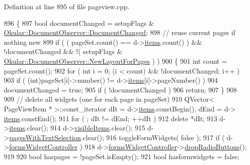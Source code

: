 Definition at line 895 of file pageview.\+cpp.


\begin{DoxyCode}
896 \{
897     \textcolor{keywordtype}{bool} documentChanged = setupFlags & 
      \hyperlink{classOkular_1_1DocumentObserver_aba00584af99894f95a9650e91f109d40ae599564392c01b22e96eff7602c4dd03}{Okular::DocumentObserver::DocumentChanged};
898     \textcolor{comment}{// reuse current pages if nothing new}
899     \textcolor{keywordflow}{if} ( ( pageSet.count() == d->\hyperlink{classPageViewPrivate_ad90c795dead9abfaa5818a94e00435bc}{items}.count() ) && !documentChanged && !( setupFlags & 
      \hyperlink{classOkular_1_1DocumentObserver_aba00584af99894f95a9650e91f109d40a053812331fcd35ccec8538c45d209799}{Okular::DocumentObserver::NewLayoutForPages} ) )
900     \{
901         \textcolor{keywordtype}{int} count = pageSet.count();
902         \textcolor{keywordflow}{for} ( \textcolor{keywordtype}{int} i = 0; (i < count) && !documentChanged; i++ )
903             \textcolor{keywordflow}{if} ( (\textcolor{keywordtype}{int})pageSet[i]->number() != d->\hyperlink{classPageViewPrivate_ad90c795dead9abfaa5818a94e00435bc}{items}[i]->pageNumber() )
904                 documentChanged = \textcolor{keyword}{true};
905         \textcolor{keywordflow}{if} ( !documentChanged )
906             \textcolor{keywordflow}{return};
907     \}
908 
909     \textcolor{comment}{// delete all widgets (one for each page in pageSet)}
910     QVector< PageViewItem * >::const\_iterator dIt = d->\hyperlink{classPageViewPrivate_ad90c795dead9abfaa5818a94e00435bc}{items}.constBegin(), dEnd = d->
      \hyperlink{classPageViewPrivate_ad90c795dead9abfaa5818a94e00435bc}{items}.constEnd();
911     \textcolor{keywordflow}{for} ( ; dIt != dEnd; ++dIt )
912         \textcolor{keyword}{delete} *dIt;
913     d->\hyperlink{classPageViewPrivate_ad90c795dead9abfaa5818a94e00435bc}{items}.clear();
914     d->\hyperlink{classPageViewPrivate_a918fbcda86c5b2b449c97e818ab5d5f9}{visibleItems}.clear();
915     d->\hyperlink{classPageViewPrivate_ad82b596dc262e93c2268297b9eee8956}{pagesWithTextSelection}.clear();
916     toggleFormWidgets( \textcolor{keyword}{false} );
917     \textcolor{keywordflow}{if} ( d->\hyperlink{classPageViewPrivate_a0b24eb01788092e1699d8380c88fb295}{formsWidgetController} )
918         d->\hyperlink{classPageViewPrivate_a0b24eb01788092e1699d8380c88fb295}{formsWidgetController}->\hyperlink{classFormWidgetsController_a06c4ce604513b55ad556fefc0b626fcc}{dropRadioButtons}();
919 
920     \textcolor{keywordtype}{bool} haspages = !pageSet.isEmpty();
921     \textcolor{keywordtype}{bool} hasformwidgets = \textcolor{keyword}{false};

\end{DoxyCode}
